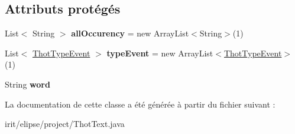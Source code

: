 \subsection*{Attributs protégés}
\begin{DoxyCompactItemize}
\item 
\mbox{\label{classfr_1_1irit_1_1elipse_1_1project_1_1_thot_text_a4eb0f3a7347844800465d15cdb6c8c94}} 
List$<$ String $>$ {\bfseries all\+Occurency} = new Array\+List$<$String$>$(1)
\item 
\mbox{\label{classfr_1_1irit_1_1elipse_1_1project_1_1_thot_text_a791d32b4a7e571b951d8b8cf8894909e}} 
List$<$ \mbox{\hyperlink{enumfr_1_1irit_1_1elipse_1_1project_1_1_thot_type_event}{Thot\+Type\+Event}} $>$ {\bfseries type\+Event} = new Array\+List$<$\mbox{\hyperlink{enumfr_1_1irit_1_1elipse_1_1project_1_1_thot_type_event}{Thot\+Type\+Event}}$>$(1)
\item 
\mbox{\label{classfr_1_1irit_1_1elipse_1_1project_1_1_thot_text_a0c7d4121d49d44ff07f99b04aaeb625f}} 
String {\bfseries word}
\end{DoxyCompactItemize}


La documentation de cette classe a été générée à partir du fichier suivant \+:\begin{DoxyCompactItemize}
\item 
irit/elipse/project/Thot\+Text.\+java\end{DoxyCompactItemize}
